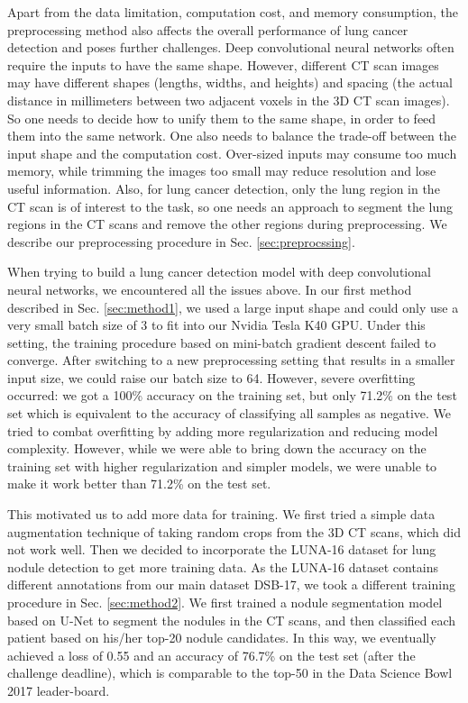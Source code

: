 \documentclass{article}
\begin{document}
Apart from the data limitation, computation cost, and memory consumption, the preprocessing method also affects the overall performance of lung cancer detection and poses further challenges. Deep convolutional neural networks often require the inputs to have the same shape. However, different CT scan images may have different shapes (lengths, widths, and heights) and spacing (the actual distance in millimeters between two adjacent voxels in the 3D CT scan images). So one needs to decide how to unify them to the same shape, in order to feed them into the same network. One also needs to balance the trade-off between the input shape and the computation cost. Over-sized inputs may consume too much memory, while trimming the images too small may reduce resolution and lose useful information. Also, for lung cancer detection, only the lung region in the CT scan is of interest to the task, so one needs an approach to segment the lung regions in the CT scans and remove the other regions during preprocessing. We describe our preprocessing procedure in Sec. \ref{sec:preprocssing}.

When trying to build a lung cancer detection model with deep convolutional neural networks, we encountered all the issues above. In our first method described in Sec. \ref{sec:method1}, we used a large input shape and could only use a very small batch size of 3 to fit into our Nvidia Tesla K40 GPU. Under this setting, the training procedure based on mini-batch gradient descent failed to converge. After switching to a new preprocessing setting that results in a smaller input size, we could raise our batch size to 64. However, severe overfitting occurred: we got a 100\% accuracy on the training set, but only 71.2\% on the test set which is equivalent to the accuracy of classifying all samples as negative. We tried to combat overfitting by adding more regularization and reducing model complexity. However, while we were able to bring down the accuracy on the training set with higher regularization and simpler models, we were unable to make it work better than 71.2\% on the test set.

This motivated us to add more data for training. We first tried a simple data augmentation technique of taking random crops from the 3D CT scans, which did not work well. Then we decided to incorporate the LUNA-16 dataset for lung nodule detection to get more training data. As the LUNA-16 dataset contains different annotations from our main dataset DSB-17, we took a different training procedure in Sec. \ref{sec:method2}. We first trained a nodule segmentation model based on U-Net \cite{ronneberger2015u} to segment the nodules in the CT scans, and then classified each patient based on his/her top-20 nodule candidates. In this way, we eventually achieved a loss of 0.55 and an accuracy of 76.7\% on the test set (after the challenge deadline), which is comparable to the top-50 in the Data Science Bowl 2017 leader-board.
\end{document}

